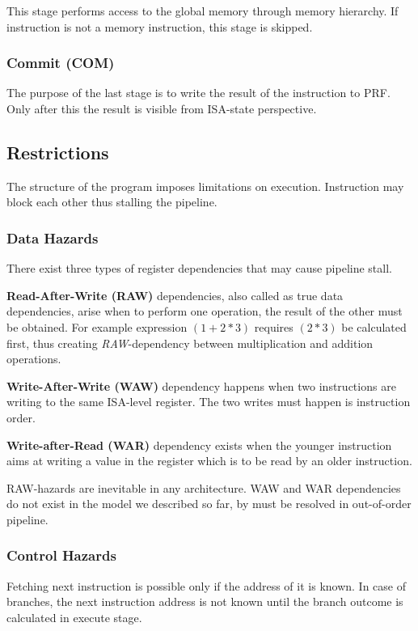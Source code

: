This stage performs access to the global memory through memory hierarchy. If instruction is not a memory instruction, this stage is skipped.

\subsubsection{Commit (COM)}

The purpose of the last stage is to write the result of the instruction to PRF. Only after this the result is visible from ISA-state perspective.

\subsection{Restrictions}

The structure of the program imposes limitations on execution. Instruction may block each other thus stalling the pipeline. 

\subsubsection{Data Hazards}

There exist three types of register dependencies that may cause pipeline stall.

\textbf{Read-After-Write (RAW)} dependencies, also called as true data dependencies, arise when to perform one operation, the result of the other must be obtained. For example expression $(1 + 2 * 3)$ requires $(2 * 3)$ be calculated first, thus creating \textit{RAW}-dependency between multiplication and addition operations.

\textbf{Write-After-Write (WAW)} dependency happens when two instructions are writing to the same ISA-level register. The two writes must happen is instruction order.

\textbf{Write-after-Read (WAR)} dependency exists when the younger instruction aims at writing a value in the register which is to be read by an older instruction.

RAW-hazards are inevitable in any architecture. WAW and WAR dependencies do not exist in the model we described so far, by must be resolved in out-of-order pipeline.

\subsubsection{Control Hazards}

Fetching next instruction is possible only if the address of it is known. In case of branches, the next instruction address is not known until the branch outcome is calculated in execute stage.

